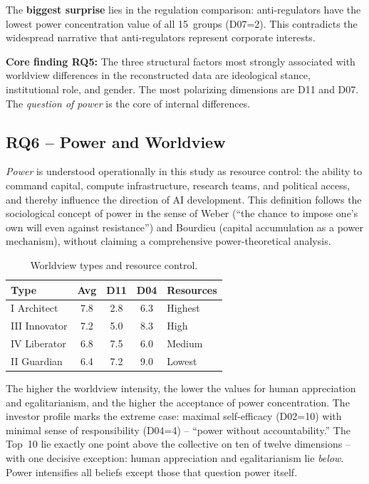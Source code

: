 \documentclass[12pt,a4paper]{article}
\begin{document}
The \textbf{biggest surprise} lies in the regulation comparison: anti-regulators have the lowest power concentration value of all 15~groups (D07=2). This contradicts the widespread narrative that anti-regulators represent corporate interests.

\medskip
\noindent\textbf{Core finding RQ5:} The three structural factors most strongly associated with worldview differences in the reconstructed data are ideological stance, institutional role, and gender. The most polarizing dimensions are D11 and D07. The \emph{question of power} is the core of internal differences.


\subsection{RQ6 -- Power and Worldview}
\label{sec:ergebnisse:f6}

\emph{Power} is understood operationally in this study as resource control: the ability to command capital, compute infrastructure, research teams, and political access, and thereby influence the direction of AI development. This definition follows the sociological concept of power in the sense of Weber (``the chance to impose one's own will even against resistance'') and Bourdieu (capital accumulation as a power mechanism), without claiming a comprehensive power-theoretical analysis.

\begin{table}[htbp]
  \centering
  \caption{Worldview types and resource control.}
  \label{tab:macht}
  \begin{tabular}{l c c c l}
    \toprule
    \textbf{Type} & \textbf{Avg} & \textbf{D11} & \textbf{D04} & \textbf{Resources} \\
    \midrule
    I Architect   & 7.8 & 2.8 & 6.3 & Highest \\
    III Innovator & 7.2 & 5.0 & 8.3 & High \\
    IV Liberator  & 6.8 & 7.5 & 6.0 & Medium \\
    II Guardian   & 6.4 & 7.2 & 9.0 & Lowest \\
    \bottomrule
  \end{tabular}
\end{table}

The higher the worldview intensity, the lower the values for human appreciation and egalitarianism, and the higher the acceptance of power concentration. The investor profile marks the extreme case: maximal self-efficacy (D02=10) with minimal sense of responsibility (D04=4) -- ``power without accountability.'' The Top~10 lie exactly one point above the collective on ten of twelve dimensions -- with one decisive exception: human appreciation and egalitarianism lie \emph{below}. Power intensifies all beliefs except those that question power itself.
\end{document}
